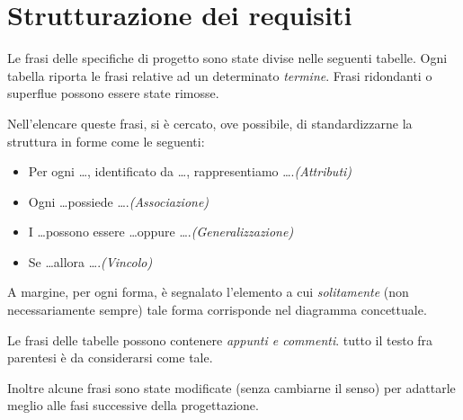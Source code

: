 \section{Strutturazione dei requisiti} \label{sec:reqtables}
Le frasi delle specifiche di progetto sono state divise nelle seguenti tabelle.
Ogni tabella riporta le frasi relative ad un determinato {\it termine}. Frasi
ridondanti o superflue possono essere state rimosse.

\begin{samepage}
Nell'elencare queste frasi, si è cercato, ove possibile, di standardizzarne la
struttura in forme come le seguenti:
\begin{itemize}
    \item Per ogni \ldots, identificato da \ldots, rappresentiamo \ldots.\hfill\textit{(Attributi)}
    \item Ogni \ldots possiede \ldots.\hfill\textit{(Associazione)}
    \item I \ldots possono essere \ldots oppure \ldots.\hfill\textit{(Generalizzazione)}
    \item Se \ldots allora \ldots.\hfill\textit{(Vincolo)}
\end{itemize}
A margine, per ogni forma, è segnalato l'elemento a cui {\it solitamente}
(non necessariamente sempre) tale forma corrisponde nel diagramma concettuale.
\end{samepage}

Le frasi delle tabelle possono contenere {\it appunti e commenti}. tutto il testo fra
parentesi è da considerarsi come tale.

Inoltre alcune frasi sono state modificate (senza cambiarne il senso)
per adattarle meglio alle fasi successive della progettazione.

